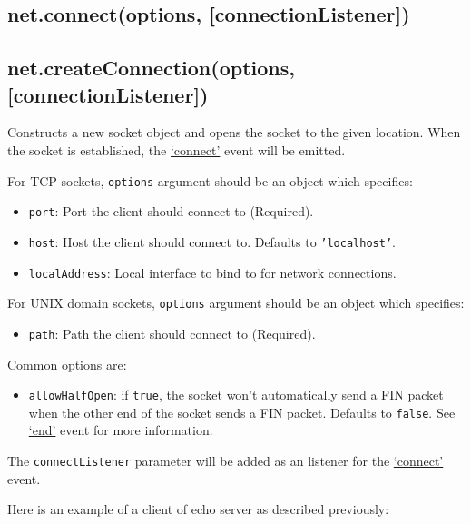 \subsection{net.connect(options, {[}connectionListener{]})}

\subsection{net.createConnection(options, {[}connectionListener{]})}

Constructs a new socket object and opens the socket to the given
location. When the socket is established, the
\hyperref[net\_event\_connect]{`connect'} event will be emitted.

For TCP sockets, \texttt{options} argument should be an object which
specifies:

\begin{itemize}
\item
  \texttt{port}: Port the client should connect to (Required).
\item
  \texttt{host}: Host the client should connect to. Defaults to
  \texttt{'localhost'}.
\item
  \texttt{localAddress}: Local interface to bind to for network
  connections.
\end{itemize}

For UNIX domain sockets, \texttt{options} argument should be an object
which specifies:

\begin{itemize}
\item
  \texttt{path}: Path the client should connect to (Required).
\end{itemize}

Common options are:

\begin{itemize}
\item
  \texttt{allowHalfOpen}: if \texttt{true}, the socket won't
  automatically send a FIN packet when the other end of the socket sends
  a FIN packet. Defaults to \texttt{false}. See
  \hyperref[net\_event\_end]{`end'} event for more information.
\end{itemize}

The \texttt{connectListener} parameter will be added as an listener for
the \hyperref[net\_event\_connect]{`connect'} event.

Here is an example of a client of echo server as described previously:

